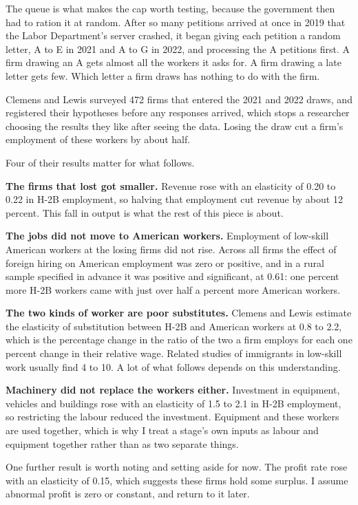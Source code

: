 \documentclass[11pt,a4paper]{article}
\begin{document}
The queue is what makes the cap worth testing, because the government then had to ration it at random. After so many petitions arrived at once in 2019 that the Labor Department's server crashed, it began giving each petition a random letter, A to E in 2021 and A to G in 2022, and processing the A petitions first. A firm drawing an A gets almost all the workers it asks for. A firm drawing a late letter gets few. Which letter a firm draws has nothing to do with the firm.

Clemens and Lewis surveyed 472 firms that entered the 2021 and 2022 draws, and registered their hypotheses before any responses arrived, which stops a researcher choosing the results they like after seeing the data. Losing the draw cut a firm's employment of these workers by about half.

Four of their results matter for what follows.

\textbf{The firms that lost got smaller.} Revenue rose with an elasticity of 0.20
to 0.22 in H-2B employment, so halving that employment cut revenue by about 12
percent. This fall in output is what the rest of this piece is about.

\textbf{The jobs did not move to American workers.} Employment of low-skill
American workers at the losing firms did not rise. Across all firms the effect of
foreign hiring on American employment was zero or positive, and in a rural sample
specified in advance it was positive and significant, at 0.61: one percent more
H-2B workers came with just over half a percent more American workers.

\textbf{The two kinds of worker are poor substitutes.} Clemens and Lewis estimate
the elasticity of substitution between H-2B and American workers at 0.8 to 2.2,
which is the percentage change in the ratio of the two a firm employs for each one
percent change in their relative wage. Related studies of immigrants in low-skill
work usually find 4 to 10. A lot of what follows depends on this understanding.

\textbf{Machinery did not replace the workers either.} Investment in equipment,
vehicles and buildings rose with an elasticity of 1.5 to 2.1 in H-2B employment,
so restricting the labour reduced the investment. Equipment and these workers are
used together, which is why I treat a stage's own inputs as labour and equipment
together rather than as two separate things.

One further result is worth noting and setting aside for now. The profit rate rose with
an elasticity of 0.15, which suggests these firms hold some surplus. I assume
abnormal profit is zero or constant, and return to it later.
\end{document}
